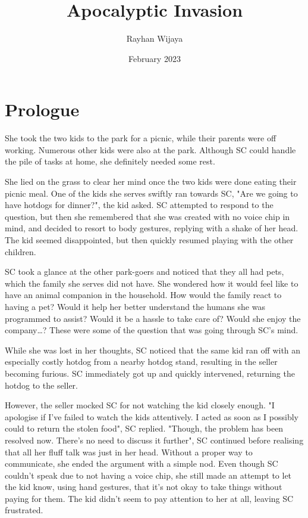 \documentclass[12pt]{book}
\title{Apocalyptic Invasion}
\author{Rayhan Wijaya}
\date{February 2023}
\begin{document}
\maketitle

\section*{Prologue}

She took the two kids to the park for a picnic, while
their parents were off working. Numerous other kids were
also at the park. Although SC could handle the pile of
tasks at home, she definitely needed some rest.

She lied on the grass to clear her mind once the two kids
were done eating their picnic meal. One of the kids she
serves swiftly ran towards SC, "Are we going to have
hotdogs for dinner?", the kid asked. SC attempted to
respond to the question, but then she remembered that she
was created with no voice chip in mind, and decided to
resort to body gestures, replying with a shake of her
head. The kid seemed disappointed, but then quickly
resumed playing with the other children.

SC took a glance at the other park-goers and noticed that
they all had pets, which the family she serves did not
have. She wondered how it would feel like to have an
animal companion in the household. How would the family
react to having a pet? Would it help her better
understand the humans she was programmed to assist? Would
it be a hassle to take care of? Would she enjoy the
company…? These were some of the question that was going
through SC’s mind.

While she was lost in her thoughts, SC noticed that the
same kid ran off with an especially costly hotdog from a
nearby hotdog stand, resulting in the seller becoming
furious. SC immediately got up and quickly intervened,
returning the hotdog to the seller.

However, the seller mocked SC for not watching the kid
closely enough. "I apologise if I’ve failed to watch the
kids attentively. I acted as soon as I possibly could to
return the stolen food", SC replied. "Though, the problem
has been resolved now. There’s no need to discuss it
further", SC continued before realising that all her
fluff talk was just in her head. Without a proper way to
communicate, she ended the argument with a simple nod.
Even though SC couldn’t speak due to not having a voice
chip, she still made an attempt to let the kid know,
using hand gestures, that it’s not okay to take things
without paying for them. The kid didn’t seem to pay
attention to her at all, leaving SC frustrated.
\end{document}

